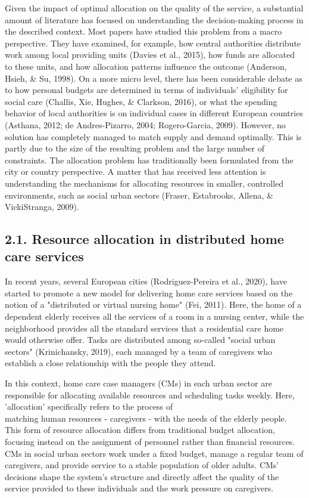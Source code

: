 \documentclass[10pt]{article}
\begin{document}
Given the impact of optimal allocation on the quality of the service, a substantial amount of literature has focused on understanding the decision-making process in the described context. Most papers have studied this problem from a macro perspective. They have examined, for example, how central authorities distribute work among local providing units (Davies et al., 2015), how funds are allocated to these units, and how allocation patterns influence the outcome (Anderson, Hsieh, \& Su, 1998). On a more micro level, there has been considerable debate as to how personal budgets are determined in terms of individuals' eligibility for social care (Challis, Xie, Hughes, \& Clarkson, 2016), or what the spending behavior of local authorities is on individual cases in different European countries (Asthana, 2012; de Andres-Pizarro, 2004; Rogero-Garcia, 2009). However, no solution has completely managed to match supply and demand optimally. This is partly due to the size of the resulting problem and the large number of constraints. The allocation problem has traditionally been formulated from the city or country perspective. A matter that has received less attention is understanding the mechanisms for allocating resources in smaller, controlled environments, such as social urban sectors (Fraser, Estabrooks, Allena, \& VickiStranga, 2009).

\subsection*{2.1. Resource allocation in distributed home care services}
In recent years, several European cities (Rodriguez-Pereira et al., 2020), have started to promote a new model for delivering home care services based on the notion of a "distributed or virtual nursing home" (Fei, 2011). Here, the home of a dependent elderly receives all the services of a room in a nursing center, while the neighborhood provides all the standard services that a residential care home would otherwise offer. Tasks are distributed among so-called "social urban sectors" (Krinichansky, 2019), each managed by a team of caregivers who establish a close relationship with the people they attend.

In this context, home care case managers (CMs) in each urban sector are responsible for allocating available resources and scheduling tasks weekly. Here, 'allocation' specifically refers to the process of\\
matching human resources - caregivers - with the needs of the elderly people. This form of resource allocation differs from traditional budget allocation, focusing instead on the assignment of personnel rather than financial resources. CMs in social urban sectors work under a fixed budget, manage a regular team of caregivers, and provide service to a stable population of older adults. CMs' decisions shape the system's structure and directly affect the quality of the service provided to these individuals and the work pressure on caregivers.
\end{document}

